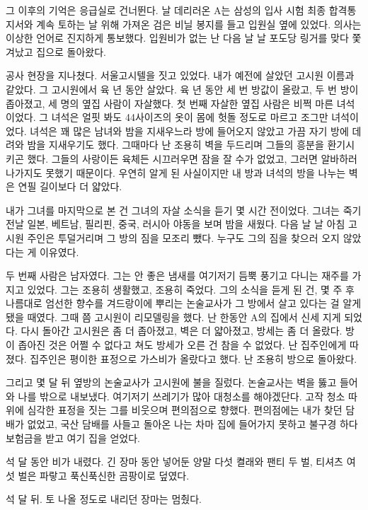 \documentclass[a5paper,10pt, twoside, openright]{memoir}
\begin{document}
	그 이후의 기억은 응급실로 건너뛴다. 날 데리러온 A는 삼성의 입사 시험 최종 합격통지서와 계속 토하는 날 위해 가져온 검은 비닐 봉지를 들고 입원실 옆에 있었다. 의사는 이상한 언어로 진지하게 통보했다. 입원비가 없는 난 다음 날 날 포도당 링거를 맞다 쫓겨났고  집으로 돌아왔다. 

	공사 현장을 지나쳤다. 서울고시텔을 짓고 있었다. 내가 예전에 살았던 고시원 이름과 같았다. 그 고시원에서 육 년 동안 살았다. 육 년 동안 세 번 방값이 올랐고, 두 번 방이 좁아졌고, 세 명의 옆집 사람이 자살했다. 첫 번째 자살한 옆집 사람은 비쩍 마른 녀석이었다. 그 녀석은 얼핏 봐도 44사이즈의 옷이 몸에 헛돌 정도로 마르고 조그만 녀석이었다. 녀석은 꽤 많은 남녀와 밤을 지새우느라 방에 들어오지 않았고 가끔 자기 방에 데려와 밤을 지새우기도 했다. 그때마다 난 조용히 벽을 두드리며 그들의 흥분을 환기시키곤 했다. 그들의 사랑이든 육체든 시끄러우면 잠을 잘 수가 없었고, 그러면 알바하러 나가지도 못했기 때문이다. 우연히 알게 된 사실이지만 내 방과 녀석의 방을 나누는 벽은 연필 길이보다 더 얇았다. 

	내가 그녀를 마지막으로 본 건 그녀의 자살 소식을 듣기 몇 시간 전이었다. 그녀는 죽기 전날 일본, 베트남, 필리핀, 중국, 러시아 야동을 보며 밤을 새웠다. 다음 날 날 아침 고시원 주인은 투덜거리며 그 방의 짐을 모조리 뺐다. 누구도 그의 짐을 찾으러 오지 않았다는 게 이유였다. 

	두 번째 사람은 남자였다. 그는 안 좋은 냄새를 여기저기 듬뿍 풍기고 다니는 재주를 가지고 있었다. 그는 조용히 생활했고, 조용히 죽었다. 그의 소식을 듣게 된 건, 몇 주 후 나름대로 엄선한 향수를 겨드랑이에 뿌리는 논술교사가 그 방에서 살고 있다는 걸 알게 됐을 때였다. 그때 쯤 고시원이 리모델링을 했다. 난 한동안 A의 집에서 신세 지게 되었다. 다시 돌아간 고시원은 좀 더 좁아졌고, 벽은 더 얇아졌고, 방세는 좀 더 올랐다. 방이 좁아진 것은 어쩔 수 없다고 쳐도 방세가 오른 건 참을 수 없었다. 난 집주인에게 따졌다. 집주인은 평이한 표정으로 가스비가 올랐다고 했다. 난 조용히 방으로 돌아왔다. 

	그리고 몇 달 뒤 옆방의 논술교사가 고시원에 불을 질렀다. 논술교사는 벽을 뚫고 들어와 나를 밖으로 내보냈다. 여기저기 쓰레기가 많아 대청소를 해야겠단다. 고작 청소 따위에 심각한 표정을 짓는 그를 비웃으며 편의점으로 향했다. 편의점에는 내가 찾던 담배가 없었고, 국산 담배를 사들고 돌아온 나는 차마 집에 들어가지 못하고 불구경 하다 보험금을 받고 여기 집을 얻었다. 

	석 달 동안 비가 내렸다. 긴 장마 동안 넣어둔 양말 다섯 켤래와 팬티 두 벌, 티셔츠 여섯 벌은 파랗고 푹신푹신한 곰팡이로 덮였다. 

	석 달 뒤. 토 나올 정도로 내리던 장마는 멈췄다. 
	
\end{document}
